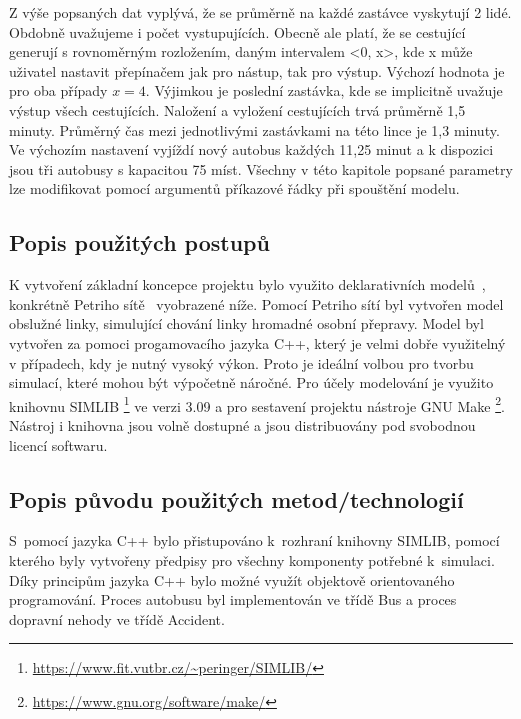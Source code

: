 \documentclass[a4paper]{article}
\begin{document}
 		Z výše popsaných dat vyplývá, že se průměrně na každé zastávce vyskytují 2 lidé. Obdobně uvažujeme i počet vystupujících. Obecně ale platí, že se cestující generují s rovnoměrným rozložením, daným intervalem <0, x>, kde x může uživatel nastavit přepínačem jak pro nástup, tak pro výstup. Výchozí hodnota je pro oba případy $x = 4$. Výjimkou je poslední zastávka, kde se implicitně uvažuje výstup všech cestujících.
 		Naložení a vyložení cestujících trvá průměrně 1,5 minuty. Průměrný čas mezi jednotlivými zastávkami na této lince je 1,3 minuty. 
 		Ve výchozím nastavení vyjíždí nový autobus každých 11,25 minut a k dispozici jsou tři autobusy s kapacitou 75 míst.  Všechny v této kapitole popsané parametry lze modifikovat pomocí argumentů příkazové řádky při spouštění modelu.
     
        \subsection{Popis použitých postupů}
        \label{subsec:methods}

            K vytvoření základní koncepce projektu bylo využito deklarativních modelů~\cite[snímek 49]{IMS_slides}, konkrétně Petriho sítě~\cite[snímek 123]{IMS_slides} vyobrazené níže.
            Pomocí Petriho sítí byl vytvořen model obslužné linky, simulující chování linky hromadné osobní přepravy. Model byl vytvořen za pomoci progamovacího jazyka C++, který je velmi dobře využitelný v případech, kdy je nutný vysoký výkon. Proto je ideální volbou pro tvorbu simulací, které mohou být výpočetně náročné. Pro účely modelování je využito knihovnu SIMLIB \footnote{\url{https://www.fit.vutbr.cz/~peringer/SIMLIB/}} ve verzi 3.09 a pro sestavení projektu nástroje GNU Make \footnote{\url{https://www.gnu.org/software/make/}}. Nástroj i knihovna jsou volně dostupné a jsou distribuovány pod svobodnou licencí softwaru.
            
        \subsection{Popis původu použitých metod/technologií}
        \label{subsec:techology}

			S~pomocí jazyka C++ bylo přistupováno k~rozhraní knihovny SIMLIB, pomocí kterého byly vytvořeny předpisy pro všechny komponenty potřebné k~simulaci. Díky principům jazyka C++ bylo možné využít objektově orientovaného programování. Proces autobusu byl implementován ve třídě Bus a proces dopravní nehody ve třídě Accident.
\end{document}
